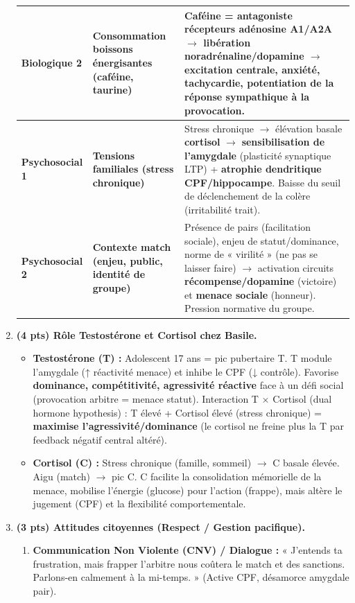 \documentclass[11pt]{article}
\begin{document}
\begin{corrige}
\begin{enumerate}
\begin{center}
\begin{tabularx}{\linewidth}{|l|X|X|}
\hline
\textbf{Biologique 2} & \textbf{Consommation boissons énergisantes (caféine, taurine)} & Caféine = antagoniste récepteurs \textbf{adénosine A1/A2A} $\to$ libération \textbf{noradrénaline/dopamine} $\to$ excitation centrale, anxiété, tachycardie, \textbf{potentiation de la réponse sympathique} à la provocation. \\
\hline
\textbf{Psychosocial 1} & \textbf{Tensions familiales (stress chronique)} & Stress chronique $\to$ élévation basale \textbf{cortisol} $\to$ \textbf{sensibilisation de l'amygdale} (plasticité synaptique LTP) + \textbf{atrophie dendritique CPF/hippocampe}. Baisse du seuil de déclenchement de la colère (irritabilité trait). \\
\hline
\textbf{Psychosocial 2} & \textbf{Contexte match (enjeu, public, identité de groupe)} & Présence de pairs (facilitation sociale), enjeu de statut/dominance, norme de « virilité » (ne pas se laisser faire) $\to$ activation circuits \textbf{récompense/dopamine} (victoire) et \textbf{menace sociale} (honneur). Pression normative du groupe. \\
\hline
\end{tabularx}
\end{center}
\item \textbf{(4 pts) Rôle Testostérone et Cortisol chez Basile.}
\begin{itemize}
\item \textbf{Testostérone (T) :} Adolescent 17 ans = pic pubertaire T. T module l'amygdale (↑ réactivité menace) et inhibe le CPF (↓ contrôle). Favorise \textbf{dominance, compétitivité, agressivité réactive} face à un défi social (provocation arbitre = menace statut). Interaction T $\times$ Cortisol (dual hormone hypothesis) : T élevé + Cortisol élevé (stress chronique) = \textbf{maximise l'agressivité/dominance} (le cortisol ne freine plus la T par feedback négatif central altéré).
\item \textbf{Cortisol (C) :} Stress chronique (famille, sommeil) $\to$ C basale élevée. Aigu (match) $\to$ pic C. C facilite la consolidation mémorielle de la menace, mobilise l'énergie (glucose) pour l'action (frappe), mais altère le jugement (CPF) et la flexibilité comportementale.
\end{itemize}
\item \textbf{(3 pts) Attitudes citoyennes (Respect / Gestion pacifique).}
\begin{enumerate}
\item \textbf{Communication Non Violente (CNV) / Dialogue :} « J'entends ta frustration, mais frapper l'arbitre nous coûtera le match et des sanctions. Parlons-en calmement à la mi-temps. » (Active CPF, désamorce amygdale pair).

\end{enumerate}
\end{enumerate}
\end{corrige}
\end{document}
